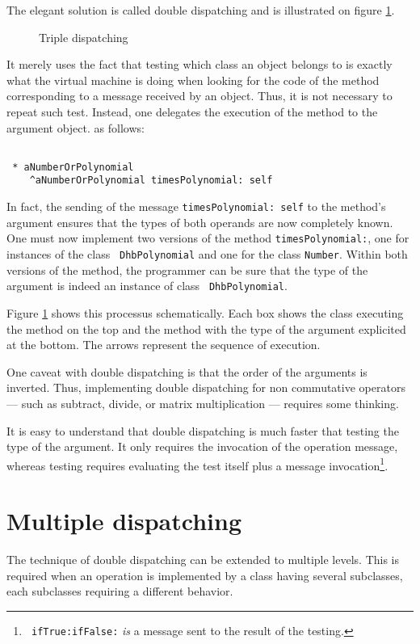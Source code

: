 \documentclass[twoside]{book}
\begin{document}
The elegant solution is called double dispatching and is
illustrated on figure \ref{fig:doubledispatch}.
\begin{figure}
\center{}
\caption{Triple dispatching}\label{fig:doubledispatch}
\end{figure}
It merely uses the fact that testing which class an object belongs
to is exactly what the virtual machine is doing when looking for
the code of the method corresponding to a message received by an
object. Thus, it is not necessary to repeat such test. Instead,
one delegates the execution of the method to the argument object.
as follows:
\begin{codeExample}
\begin{verbatim}

 * aNumberOrPolynomial
    ^aNumberOrPolynomial timesPolynomial: self
\end{verbatim}
\end{codeExample}
In fact, the sending of the message {\tt timesPolynomial: self} to
the method's argument ensures that the types of both operands are
now completely known. One must now implement two versions of the
method {\tt timesPolynomial:}, one for instances of the class {\tt
DhbPolynomial} and one for the class {\tt Number}. Within both
versions of the method, the programmer can be sure that the type
of the argument is indeed an instance of class {\tt
DhbPolynomial}.

Figure \ref{fig:doubledispatch} shows this processus
schematically. Each box shows the class executing the method on
the top and the method with the type of the argument explicited at
the bottom. The arrows represent the sequence of execution.

One caveat with double dispatching is that the order of the
arguments is inverted. Thus, implementing double dispatching for
non commutative operators --- such as subtract, divide, or matrix
multiplication --- requires some thinking.

It is easy to understand that double dispatching is much faster
that testing the type of the argument. It only requires the
invocation of the operation message, whereas testing requires
evaluating the test itself plus a message invocation\footnote{{\tt
ifTrue:ifFalse:} {\it is} a message sent to the result of the
testing.}.

\section{Multiple dispatching}
\label{sec:multipledisp}The technique of double dispatching can be
extended to multiple levels. This is required when an operation is
implemented by a class having several subclasses, each subclasses
requiring a different behavior.
\end{document}
